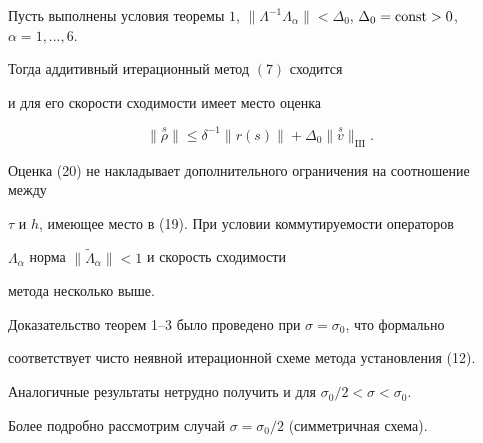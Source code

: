 \begin{thm}


Пусть выполнены условия теоремы $1$, $\|\Lambda^{-1}\Lambda_\alpha\|


<\Delta_0$, $\Delta_0=\const>0$, $\alpha=1,\dotsc,6$.


Тогда аддитивный итерационный метод $(7)$ сходится


и для его скорости сходимости имеет место оценка


\begin{equation}


\|\overset{s}{\rho}\|\leq \delta^{-1}\|r(s)\|+\Delta_0\|\overset{s}{v}


\big\|_{\mathrm{III}}.


\end{equation}


\end{thm}





Оценка (20) не накладывает дополнительного ограничения на соотношение между


$\tau$ и $h$, имеющее место в (19). При условии коммутируемости операторов


$\Lambda_\alpha$ норма $\|\widetilde\Lambda_\alpha\|<1$ и скорость сходимости


метода несколько выше.





Доказательство теорем 1--3 было проведено при $\sigma=\sigma_0$, что формально


соответствует чисто неявной итерационной схеме метода установления (12).


Аналогичные результаты нетрудно получить и для $\sigma_0/2<\sigma<\sigma_0$.


Более подробно рассмотрим случай $\sigma=\sigma_0/2$ (симметричная схема).





